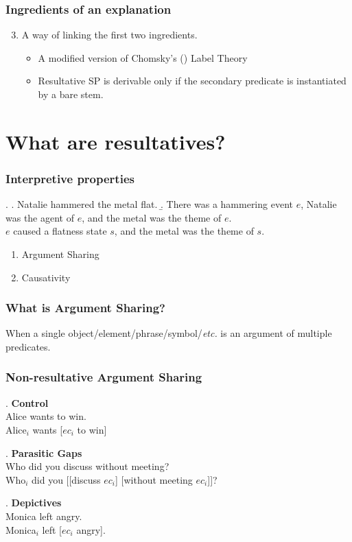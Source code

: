 \documentclass[Proposal]{subfiles}
\begin{document}
\begin{frame}
  \frametitle{Ingredients of an explanation}
  \begin{enumerate}
    \setcounter{enumi}{2}  
    \item A way of linking the first two ingredients.
      \begin{itemize}
	\item A modified version of Chomsky's (\citeyear{chomsky2013problems,chomsky2015problems}) Label Theory
	\item Resultative SP is derivable only if the secondary predicate is instantiated by a bare stem.
      \end{itemize}
  \end{enumerate}
\end{frame}
\section{What are resultatives?}
\begin{frame}
  \frametitle{Interpretive properties}
  \ex.
  \a. {\rm Natalie hammered the metal flat.}
  \b. There was a hammering event $e$, Natalie was the agent of $e$, and \alert<2|handout:0>{the metal} was the theme of $e$.\\
  $e$ \alert<3|handout:0>{caused} a flatness state $s$, and \alert<2|handout:0>{the metal} was the theme of $s$.

  \pause
  \begin{enumerate}
    \item \alert<2|handout:0>{Argument Sharing}
    \item \alert<3|handout:0>{Causativity}
  \end{enumerate}
\end{frame}
\begin{frame}
  \frametitle{What is Argument Sharing?}
  When a single object/element/phrase/symbol/\textit{etc.} is an argument of multiple predicates.
\end{frame}
\begin{frame}
  \frametitle{Non-resultative Argument Sharing}
  \pause
  \ex. \textbf{Control}\\
    {\rm Alice wants to win.}\\
    Alice$_i$ wants [$ec_i$ to win]

  \pause
\ex. \textbf{Parasitic Gaps}\\
    {\rm Who did you discuss without meeting?}\\
    Who$_i$ did you [[discuss $ec_i$] [without meeting $ec_i$]]?
    
    \pause
    \ex. \textbf{Depictives}\\
    {\rm Monica left angry.}\\
    Monica$_i$ left [$ec_i$ angry].

\end{frame}
\end{document}
